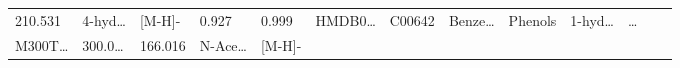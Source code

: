 \documentclass[
]{article}
\begin{document}
\begin{longtable}[]{@{}lllllllllllll@{}}
\begin{minipage}[t]{0.05\columnwidth}
210.531\strut
\end{minipage} & \begin{minipage}[t]{0.05\columnwidth}\raggedright
4-hyd\ldots{}\strut
\end{minipage} & \begin{minipage}[t]{0.05\columnwidth}\raggedright
{[}M-H{]}-\strut
\end{minipage} & \begin{minipage}[t]{0.07\columnwidth}\raggedright
0.927\strut
\end{minipage} & \begin{minipage}[t]{0.07\columnwidth}\raggedright
0.999\strut
\end{minipage} & \begin{minipage}[t]{0.05\columnwidth}\raggedright
HMDB0\ldots{}\strut
\end{minipage} & \begin{minipage}[t]{0.04\columnwidth}\raggedright
C00642\strut
\end{minipage} & \begin{minipage}[t]{0.05\columnwidth}\raggedright
Benze\ldots{}\strut
\end{minipage} & \begin{minipage}[t]{0.05\columnwidth}\raggedright
Phenols\strut
\end{minipage} & \begin{minipage}[t]{0.05\columnwidth}\raggedright
1-hyd\ldots{}\strut
\end{minipage} & \begin{minipage}[t]{0.02\columnwidth}\raggedright
\ldots{}\strut
\end{minipage}\tabularnewline
\begin{minipage}[t]{0.05\columnwidth}\raggedright
M300T\ldots{}\strut
\end{minipage} & \begin{minipage}[t]{0.05\columnwidth}\raggedright
300.0\ldots{}\strut
\end{minipage} & \begin{minipage}[t]{0.05\columnwidth}\raggedright
166.016\strut
\end{minipage} & \begin{minipage}[t]{0.05\columnwidth}\raggedright
N-Ace\ldots{}\strut
\end{minipage} & \begin{minipage}[t]{0.05\columnwidth}\raggedright
{[}M-H{]}-\strut
\end{minipage} & \begin{minipage}[t]{0.07\columnwidth}\raggedright

\end{minipage}
\end{longtable}
\end{document}

